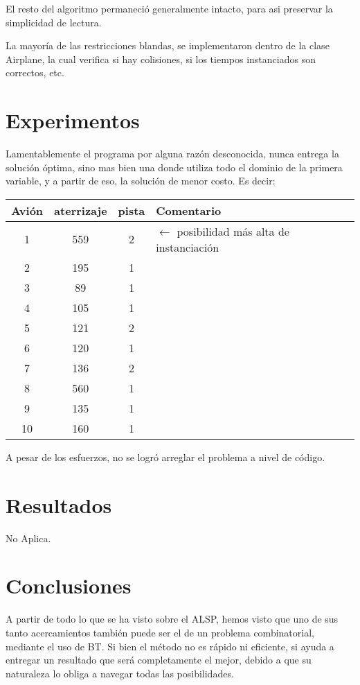 \documentclass[letter, 11pt]{article}
\begin{document}
El resto del algoritmo permaneció generalmente intacto, para asi preservar la simplicidad de lectura.

La mayoría de las restricciones blandas, se implementaron dentro de la clase Airplane, la cual verifica si hay colisiones, si los tiempos instanciados son correctos, etc.

\section{Experimentos}
Lamentablemente el programa por alguna razón desconocida, nunca entrega la solución óptima, sino mas bien una donde utiliza todo el dominio de la primera variable, y a partir de eso, la solución de menor costo. Es decir:

\begin{tabular}{ c | c | c | l}
Avión & aterrizaje & pista & Comentario\\ \hline
1 & 559 & 2  & $\leftarrow$ posibilidad más alta de instanciación\\ \hline
2 & 195 & 1 \\ \hline
3 & 89 & 1 \\ \hline
4 & 105 & 1\\ \hline
5 & 121 & 2\\ \hline
6 & 120 & 1\\ \hline
7 & 136 & 2\\ \hline
8 & 560 & 1\\ \hline
9 & 135 & 1\\ \hline
10 & 160 & 1\\ \hline
\end{tabular}

A pesar de los esfuerzos, no se logró arreglar el problema a nivel de código.

\section{Resultados}
No Aplica.

\section{Conclusiones}
A partir de todo lo que se ha visto sobre el ALSP, hemos visto que uno de sus tanto acercamientos también puede ser el de un problema combinatorial, mediante el uso de BT. Si bien el método no es rápido ni eficiente, si ayuda a entregar un resultado que será completamente el mejor, debido a que su naturaleza lo obliga a navegar todas las posibilidades.
\end{document}
